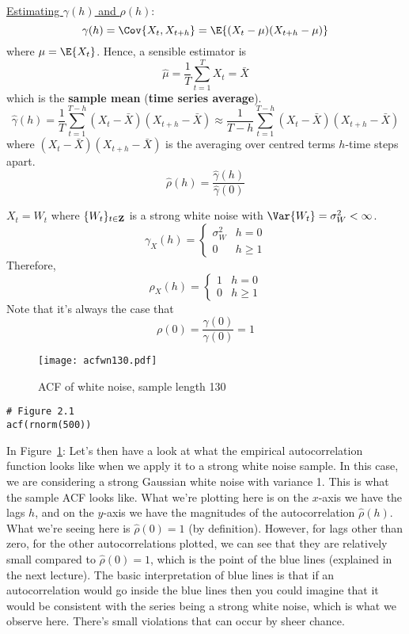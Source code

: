 \underline{Estimating $ \gamma(h) $ and $ \rho(h) $}:
\[ \gamma(h)=\Cov{X_t,X_{t+h}}=\E{(X_t-\mu)(X_{t+h}-\mu)} \]
where $ \mu=\E{X_t} $. Hence, a sensible estimator is
\[ \hat{\mu}=\frac{1}{T} \sum_{t=1}^{T} X_t=\bar{X} \]
which is the \textbf{sample mean} (\textbf{time series average}).
\[ \hat{\gamma}(h)=\frac{1}{T} \sum_{t=1}^{T-h}(X_t-\bar{X})(X_{t+h}-\bar{X})
    \approx \frac{1}{T-h} \sum_{t=1}^{T-h}(X_t-\bar{X})(X_{t+h}-\bar{X})  \]
where $ (X_t-\bar{X})(X_{t+h}-\bar{X}) $ is the averaging over
centred terms $ h $-time steps apart.
\[ \hat{\rho}(h)=\frac{\hat{\gamma}(h)}{\hat{\gamma}(0)}  \]
\begin{Example}{}{}
    $ X_t=W_t $ where $ \{W_t\}_{t\in\mathbf{Z}} $ is a strong white noise
    with $ \Var{W_t}=\sigma_W^2<\infty $.
    \[ \gamma_X(h)=\begin{cases}
            \sigma_W^2 & h=0    \\
            0          & h\ge 1
        \end{cases} \]
    Therefore,
    \[ \rho_X(h)=\begin{cases}
            1 & h=0    \\
            0 & h\ge 1
        \end{cases} \]
    Note that it's always the case that
    \[ \rho(0)=\frac{\gamma(0)}{\gamma(0)}=1  \]
\end{Example}
\begin{figure}[!htbp]
    \centering
    \texttt{[image: acfwn130.pdf]}
    \caption{ACF of white noise, sample length 130}\label{fig:acfwn130}
\end{figure}
\begin{verbatim}
# Figure 2.1
acf(rnorm(500))
\end{verbatim}
In Figure~\ref{fig:acfwn130}:
{\color{blue}Let's then have a look at what the empirical autocorrelation
function looks like when we apply it to a strong white noise sample.
In this case, we are considering a strong Gaussian white noise
with variance 1. This is what the sample ACF looks like.
What we're plotting here is on the $ x $-axis we have the lags $ h $,
and on the $ y $-axis we have the magnitudes of the autocorrelation $ \hat{\rho}(h) $.
What we're seeing here
is $ \hat{\rho}(0)=1 $ (by definition). However, for lags other than zero,
for the other autocorrelations plotted, we can see that they are
relatively small compared to $ \hat{\rho}(0)=1 $,
which is the point of the blue lines (explained
in the next lecture). The basic interpretation of blue lines is that
if an autocorrelation would go inside the blue lines then you could imagine
that it would be consistent with the series being a strong white noise,
which is what we observe here. There's small violations that can occur by
sheer chance.}

